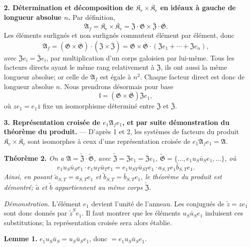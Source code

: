 \noindent\textbf{2. Détermination et décomposition de \(\mathfrak K_r\times\overline{\mathfrak K}_r\) en idéaux à gauche de longueur absolue \(n\).} Par définition,
\[
\mathfrak A_f=\mathfrak K_r\times\overline{\mathfrak K}_r
=\mathfrak Z\cdot\mathfrak G\times\overline{\mathfrak Z}\cdot\overline{\mathfrak G}.
\]
Les éléments surlignés et non surlignés commutent élément par élément, donc
\[
\mathfrak A_f
=(\mathfrak G\times\overline{\mathfrak G})\cdot(\mathfrak Z\times\overline{\mathfrak Z})
=\mathfrak G\times\overline{\mathfrak G}\cdot(\mathfrak Ze_1+\cdots+\mathfrak Ze_n),
\]
avec \(\mathfrak Ze_i=\overline{\mathfrak Z}e_i\), par multiplication d'un corps galoisien par lui-même. Tous les facteurs directs ayant le même rang relativement à \(\mathfrak Z\), ils ont aussi la même longueur absolue; or celle de \(\mathfrak A_f\) est égale à \(n^2\). Chaque facteur direct est donc de longueur absolue \(n\). Nous prendrons désormais pour base
\[
\mathfrak l=(\mathfrak G\times\overline{\mathfrak G})\mathfrak Ze_1,
\]
où \(ze_1=e_1\bar z\) fixe un isomorphisme déterminé entre \(\mathfrak Z\) et \(\overline{\mathfrak Z}\).

\noindent\textbf{3. Représentation croisée de \(e_1\mathfrak A_fe_1\), et par suite démonstration du théorème du produit.} --- D'après 1 et 2, les systèmes de facteurs du produit \(\mathfrak K_r\times\overline{\mathfrak K}_r\) sont isomorphes à ceux d'une représentation croisée de \(e_1\mathfrak A_fe_1=\mathfrak A\).

\noindent\textbf{Théorème 2.} \emph{On a \(\mathfrak A=\widetilde{\mathfrak Z}\cdot\widetilde{\mathfrak G}\), avec \(\widetilde{\mathfrak Z}=\mathfrak Ze_1=\overline{\mathfrak Z}e_1\), \(\widetilde{\mathfrak G}=\{\ldots,e_1u_S\bar u_Se_1,\ldots\}\), où}
\[
e_1u_S\bar u_Se_1\cdot e_1u_T\bar u_Te_1
=e_1u_{ST}\bar u_{ST}e_1\cdot a_{S,T}e_1\bar b_{S,T}e_1.
\]
\emph{Ainsi, en posant \(\tilde a_{S,T}=a_{S,T}e_1\) et \(\tilde b_{S,T}=\bar b_{S,T}e_1\), le théorème du produit est démontré; \(\tilde a\) et \(\tilde b\) appartiennent au même corps \(\widetilde{\mathfrak Z}\).}

\noindent\emph{Démonstration.} L'élément \(e_1\) devient l'unité de l'anneau. Les conjugués de \(\tilde z=ze_1\) sont donc donnés par \(\tilde z^Se_1\). Il faut montrer que les éléments \(u_S\bar u_Se_1\) induisent ces substitutions; la représentation croisée sera alors établie.

\noindent\textbf{Lemme 1.} \(e_1u_S\bar u_S=u_S\bar u_Se_1\), donc \(=e_1u_S\bar u_Se_1\).

